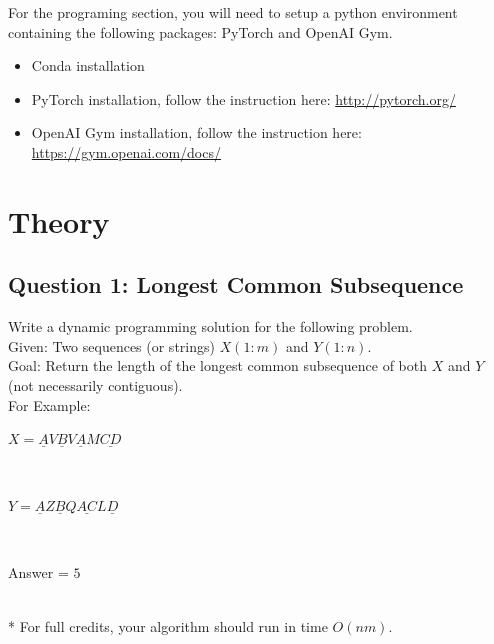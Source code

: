 \documentclass[11pt]{article}
\begin{document}
For the programing section, you will need to setup a python environment containing the following packages: PyTorch and OpenAI Gym.
\begin{itemize}
\item Conda installation
\item PyTorch installation, follow the instruction here: \url{http://pytorch.org/}
\item OpenAI Gym installation, follow the instruction here: \url{https://gym.openai.com/docs/}
\end{itemize}

\section{Theory}


\subsection{Question 1: Longest Common Subsequence}
Write a dynamic programming solution for the following problem.\\
Given: Two sequences (or strings) $X(1:m)$ and $Y(1:n)$.\\
Goal: Return the length of the longest common subsequence of both $X$ and
$Y$ (not necessarily contiguous).\\
For Example: \\
\centerline{ $X=\underline{A}V\underline{B}V\underline{A}M\underline{CD}$} \\
\centerline{ $Y=\underline{A}Z\underline{B}Q\underline{AC}L\underline{D}$} \\
\centerline{ Answer = $5$}\\

* For full credits, your algorithm should run in time $O(nm)$. 





\end{document}
